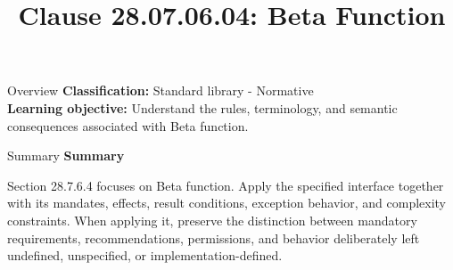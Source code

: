 \documentclass[10pt,letterpaper]{article}
\title{Clause 28.07.06.04: Beta Function}
\author{}
\date{}
\begin{document}
\maketitle
\begin{CornellOverviewBox}{Overview}
\textbf{Classification:} Standard library - Normative\\[2pt]
\textbf{Learning objective:} Understand the rules, terminology, and semantic consequences associated with Beta function.
\end{CornellOverviewBox}\begin{CornellSummaryBox}{Summary}
{\sffamily\bfseries\color{Accent} Summary}\par\vspace{3pt}Section 28.7.6.4 focuses on Beta function. Apply the specified interface together with its mandates, effects, result conditions, exception behavior, and complexity constraints. When applying it, preserve the distinction between mandatory requirements, recommendations, permissions, and behavior deliberately left undefined, unspecified, or implementation-defined.
\end{CornellSummaryBox}
\end{document}
